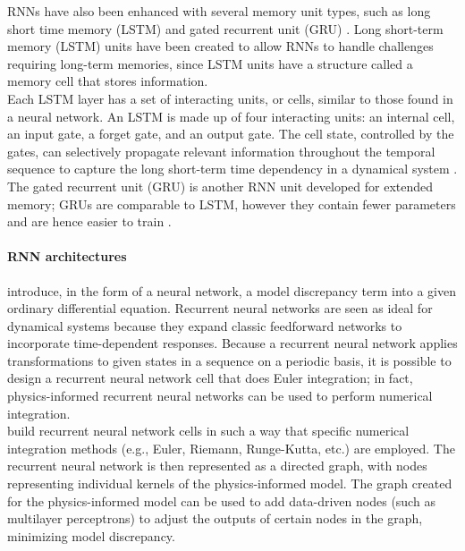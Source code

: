 \documentclass[pdflatex,sn-basic]{sn-jnl}%
\theoremstyle{thmstyleone}%
\theoremstyle{thmstyletwo}%
\theoremstyle{thmstylethree}%
\begin{document}
RNNs have also been enhanced with several memory unit types, such as long short time memory (LSTM) and gated recurrent unit (GRU) \citep{Ald2020_DeepLearningApproaches_DerADE}.
Long short-term memory (LSTM) units  have been created to allow RNNs to handle challenges requiring long-term memories, since LSTM units have a structure called a memory cell that stores information. %
\\
\noindent
Each LSTM layer has a set of interacting units, or cells, similar to those found in a neural network. An LSTM is made up of four interacting units: an internal cell, an input gate, a forget gate, and an output gate. The cell state, controlled by the gates, can selectively propagate relevant information throughout the temporal sequence to capture the long short-term time dependency in a dynamical system \citep{Zha2020_PhysicsInformedMulti_LiuZLS}.
\\
\noindent
The gated recurrent unit (GRU) is another RNN unit developed for extended memory;
GRUs are comparable to LSTM, however they contain fewer parameters and are hence easier to train \citep{Ber2019_SurveyDeepLearning_BucBBCC}.


\paragraph{RNN architectures}
\cite{Via2021_EstimatingModelInadequacy_NasVNDY} introduce, in the form of a neural network, a model discrepancy term into a given ordinary differential equation.
%
Recurrent neural networks are seen as ideal for dynamical systems because they expand classic feedforward networks to incorporate time-dependent responses. %
%
Because a recurrent neural network applies transformations to given states in a sequence on a periodic basis, it is possible to design a recurrent neural network cell that does Euler integration; in fact, physics-informed recurrent neural networks can be used to perform numerical integration. 
\\
\noindent
\cite{Via2021_EstimatingModelInadequacy_NasVNDY} 
build recurrent neural network cells in such a way that specific numerical integration methods (e.g., Euler, Riemann, Runge-Kutta, etc.) are employed. The recurrent neural network is then represented as a directed graph, with nodes representing individual kernels of the physics-informed model.
The graph created for the physics-informed model can be used to add data-driven nodes (such as multilayer perceptrons) to adjust the outputs of certain nodes in the graph, minimizing model discrepancy.
\end{document}
